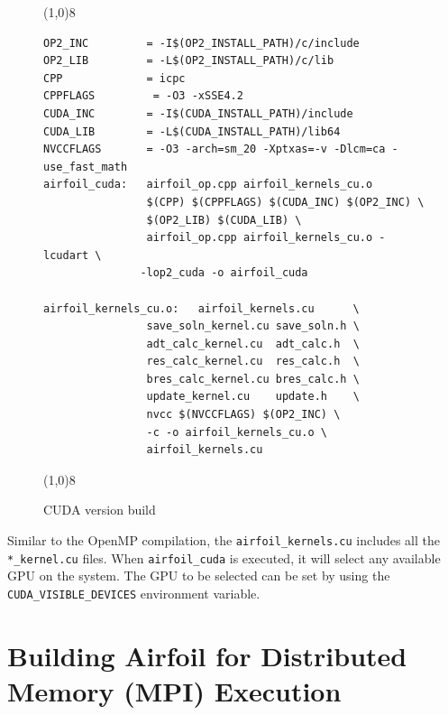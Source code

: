 \documentclass[11pt]{article}
\begin{document}
\begin{figure}[!h]\small
\vspace{-0pt}\noindent\line(1,0){8}\vspace{-10pt}
\begin{lstlisting}
OP2_INC         = -I$(OP2_INSTALL_PATH)/c/include
OP2_LIB         = -L$(OP2_INSTALL_PATH)/c/lib
CPP             = icpc
CPPFLAGS         = -O3 -xSSE4.2 
CUDA_INC        = -I$(CUDA_INSTALL_PATH)/include
CUDA_LIB        = -L$(CUDA_INSTALL_PATH)/lib64
NVCCFLAGS       = -O3 -arch=sm_20 -Xptxas=-v -Dlcm=ca -use_fast_math 
airfoil_cuda:	airfoil_op.cpp airfoil_kernels_cu.o
                $(CPP) $(CPPFLAGS) $(CUDA_INC) $(OP2_INC) \
                $(OP2_LIB) $(CUDA_LIB) \
                airfoil_op.cpp airfoil_kernels_cu.o -lcudart \
               -lop2_cuda -o airfoil_cuda                                      

airfoil_kernels_cu.o:	airfoil_kernels.cu      \
                save_soln_kernel.cu save_soln.h \
                adt_calc_kernel.cu  adt_calc.h  \
                res_calc_kernel.cu  res_calc.h  \
                bres_calc_kernel.cu bres_calc.h \
                update_kernel.cu    update.h    \
                nvcc $(NVCCFLAGS) $(OP2_INC) \
                -c -o airfoil_kernels_cu.o \
                airfoil_kernels.cu
\end{lstlisting}\vspace{-10pt}
\vspace{-0pt}\noindent\line(1,0){8}\vspace{-10pt}
\caption{\small CUDA version build }
\normalsize\vspace{-10pt}\label{fig:cudabuild}
\end{figure}

\noindent Similar to the OpenMP compilation, the \texttt{airfoil\_kernels.cu} includes all the \texttt{*\_kernel.cu}
files. When \texttt{airfoil\_cuda} is executed, it will select any available GPU  on the system. The GPU to be selected
can be set by using the \texttt{CUDA\_VISIBLE\_DEVICES} environment variable. 

\newpage
\section{Building Airfoil for Distributed Memory (MPI) Execution}\label{sec/mpi}
\end{document}
